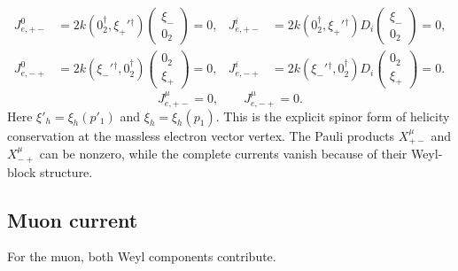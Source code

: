 \documentclass[12pt,a4paper]{article}
\numberwithin{equation}{section}
\begin{document}
\begin{align}
 J^0_{e,+-}&=2k(0_2^\dagger,\xi_+'{}^\dagger)
 \begin{pmatrix}\xi_-\\0_2\end{pmatrix}=0,&
 J^i_{e,+-}&=2k(0_2^\dagger,\xi_+'{}^\dagger)D_i
 \begin{pmatrix}\xi_-\\0_2\end{pmatrix}=0,\\
 J^0_{e,-+}&=2k(\xi_-'{}^\dagger,0_2^\dagger)
 \begin{pmatrix}0_2\\\xi_+\end{pmatrix}=0,&
 J^i_{e,-+}&=2k(\xi_-'{}^\dagger,0_2^\dagger)D_i
 \begin{pmatrix}0_2\\\xi_+\end{pmatrix}=0.
\end{align}
\begin{equation}
      \boxed{J^\mu_{e,+-}=0,\qquad J^\mu_{e,-+}=0.}
\end{equation}
Here $\xi'_h=\xi_h(p'_1)$ and $\xi_h=\xi_h(p_1)$. This is the explicit
spinor form of helicity conservation at the massless electron vector vertex.
The Pauli products $X^\mu_{+-}$ and $X^\mu_{-+}$ can be nonzero, while the
complete currents vanish because of their Weyl-block structure.

\subsection{Muon current}
For the muon, both Weyl components contribute. 
\end{document}
